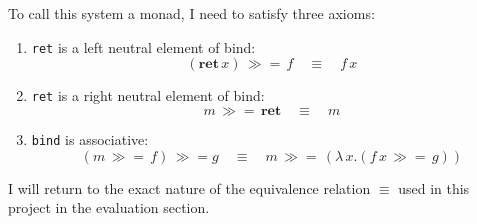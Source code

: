 \documentclass[12pt,twoside,notitlepage]{report}
\theoremstyle{plain}%
\theoremstyle{definition}
\theoremstyle{remark}
\begin{document}
To call this system a monad, I need to satisfy three axioms:

\begin{enumerate}
\item{\lstinline|ret| is a left neutral element of bind:
\[ (\textbf{ret} \, x) \, \gg=\, f \quad \equiv \quad f \, x \]}
\item{\lstinline|ret| is a right neutral element of bind:
\[ m \, \gg=\, \textbf{ret} \quad \equiv \quad m \]}
\item{\lstinline|bind| is associative:
\[ (m \, \gg= \, f) \, \gg= g \quad \equiv \quad m\, \gg= \, (\lambda\, x. (f\, x \, \gg= \, g) ) \]}
\end{enumerate}

I will return to the exact nature of the equivalence relation $ \equiv $ used in this project in the evaluation section. \label{sec:first_mention_of_equiv}


%
%
%
%
%
%
%
\end{document}
